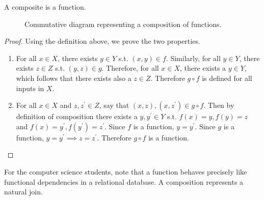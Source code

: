   \begin{theorem}[Compositions]
    A composite is a function. 
    \begin{figure}[H]
      \centering 
      \caption{Commutative diagram representing a composition of functions.} 
      \label{fig:composition}
    \end{figure}
  \end{theorem}
  \begin{proof}
    Using the definition above, we prove the two properties. 
    \begin{enumerate}
      \item For all $x \in X$, there exists $y \in Y$ s.t. $(x, y) \in f$. Similarly, for all $y \in Y$, there exists $z \in Z$ s.t. $(y, z) \in g$. Therefore, for all $x \in X$, there exists a $y \in Y$, which follows that there exists also a $z \in Z$. Therefore $g \circ f$ is defined for all inputs in $X$. 
      \item For all $x \in X$ and $z, z^\prime \in Z$, say that $(x, z), (x, z^\prime) \in g \circ f$. Then by definition of composition there exists a $y, y^\prime \in Y$ s.t. $f(x) = y, f(y) = z$ and $f(x) = y^\prime, f(y^\prime) = z^\prime$. Since $f$ is a function, $y = y^\prime$. Since $g$ is a function, $y = y^\prime \implies z = z^\prime$. Therefore $g \circ f$ is a function. 
    \end{enumerate}
  \end{proof}

  For the computer science students, note that a function behaves precisely like functional dependencies in a relational database. A composition represents a natural join. 

